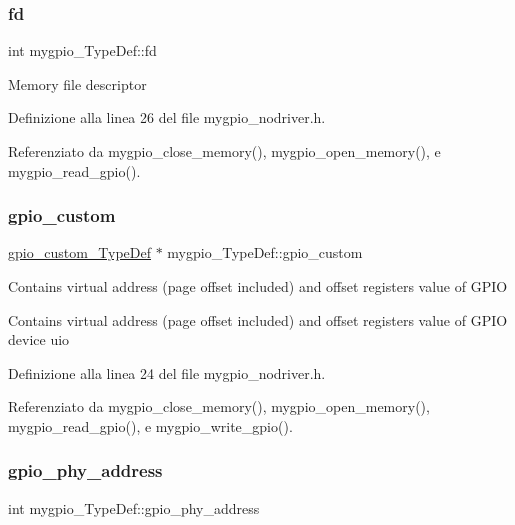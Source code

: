 \subsubsection{\texorpdfstring{fd}{fd}}
{\footnotesize\ttfamily int mygpio\+\_\+\+Type\+Def\+::fd}

Memory file descriptor 

Definizione alla linea 26 del file mygpio\+\_\+nodriver.\+h.



Referenziato da mygpio\+\_\+close\+\_\+memory(), mygpio\+\_\+open\+\_\+memory(), e mygpio\+\_\+read\+\_\+gpio().

\mbox{\label{structmygpio___type_def_a1e4038eb57b6ccd8d94a4f0258961f97}} 
\subsubsection{\texorpdfstring{gpio\+\_\+custom}{gpio\_custom}}
{\footnotesize\ttfamily \hyperlink{structgpio__custom___type_def}{gpio\+\_\+custom\+\_\+\+Type\+Def} $\ast$ mygpio\+\_\+\+Type\+Def\+::gpio\+\_\+custom}

Contains virtual address (page offset included) and offset registers value of G\+P\+IO

Contains virtual address (page offset included) and offset registers value of G\+P\+IO device uio 

Definizione alla linea 24 del file mygpio\+\_\+nodriver.\+h.



Referenziato da mygpio\+\_\+close\+\_\+memory(), mygpio\+\_\+open\+\_\+memory(), mygpio\+\_\+read\+\_\+gpio(), e mygpio\+\_\+write\+\_\+gpio().

\mbox{\label{structmygpio___type_def_a3e193df18cdd2d05417e18a99c876cc9}} 
\subsubsection{\texorpdfstring{gpio\+\_\+phy\+\_\+address}{gpio\_phy\_address}}
{\footnotesize\ttfamily int mygpio\+\_\+\+Type\+Def\+::gpio\+\_\+phy\+\_\+address}

